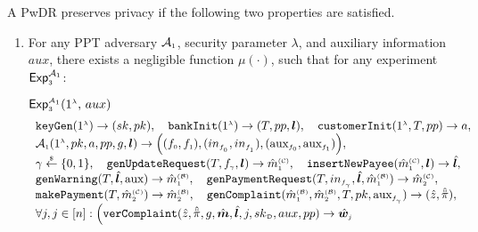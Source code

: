 



\begin{definition}[Privacy]\label{def-a::privacy} A PwDR preserves privacy if  the following two properties are satisfied.
\begin{enumerate}

\item For any PPT  adversary $\mathcal{A}_{\scriptscriptstyle 1}$,  security parameter $\lambda$, and  auxiliary information $aux$, there exists a negligible function $\mu(\cdot)$, such that for any  experiment $\mathsf{Exp}_{\scriptscriptstyle 3}^{\mathcal{A}_{\scriptscriptstyle 1}}$:



\begin{center}
\begin{mybox}[colback=white,  width=121mm, height=35mm,]{$\mathsf{Exp}_{\st 3}^{\st\mathcal{A}_{\st 1}}(1^{\st\lambda}\text{, }  {aux})$}
\vspace{-1.2mm}
$$
  \begin{array}{l}
%
 \mathtt{keyGen}(1^{\st\lambda})\rightarrow (sk,pk), \ \ \
%
  \mathtt{bankInit}(1^{\st \lambda})\rightarrow (T, pp, \bm{l}), \ \ \
%
\mathtt{customerInit} (1^{\st \lambda}, T, pp)\rightarrow a, \\
%
\mathcal{A}_{\st 1}(1^{\st \lambda}, pk, a, pp, g, \bm{l})\rightarrow \Big((f_{\st 0}, f_{\st 1}),(in_{\st f_{\st_{\st 0}}},in_{\st f_{\st _1}}),(\text{aux}_{\st f_{0}},\text{aux}_{\st f_{\st1}})\Big), \\
%
\gamma\stackrel{\st \$}\leftarrow\{0,1\}, \ \ \
%
\mathtt{genUpdateRequest}(T, f_{\st \gamma}, {\bm l})\rightarrow \hat m^{\st\mathcal{(C)}}_{\st 1}, \ \ \
%
\mathtt{insertNewPayee}(\hat{m}^{\st\mathcal{(C)}}_{\st 1}, {\bm l})\rightarrow  \hat{\bm l}, \\
%
\mathtt{genWarning}(T, \hat{\bm l}, \text{aux})\rightarrow \hat m^{\st\mathcal{(B)}}_{\st1}, \ \ \
%
\mathtt{genPaymentRequest}(T, in_{\st f_{_\gamma}}, \hat{\bm{l}}, \hat m^{\st\mathcal{(B)}}_{\st1})\rightarrow \hat m^{\st\mathcal{(C)}}_{\st2}, \\
%
\mathtt{makePayment}(T, \hat m^{\st\mathcal{(C)}}_{\st2})\rightarrow \hat m^{\st\mathcal{(B)}}_{\st2}, \ \ \
%
\mathtt{genComplaint}(\hat m^{\st\mathcal{(B)}}_{\st 1}, \hat m^{\st\mathcal{(B)}}_{\st2}, T, pk, \text{aux}_{\st f_{_\gamma}})\rightarrow (\hat z, \hat{\ddot \pi}), \\
%
 \forall j, j\in [n]:
\Big(\mathtt{verComplaint}( \hat z, \hat{\ddot{\pi}}, g, \hat{\bm m}, \hat{\bm{l}}, j, sk_{\st\mathcal D}, aux, pp)\rightarrow \hat{\bm{w}}_{\st j}

\end{array}$$
\end{mybox}
\end{center}
\end{enumerate}
\end{definition}
